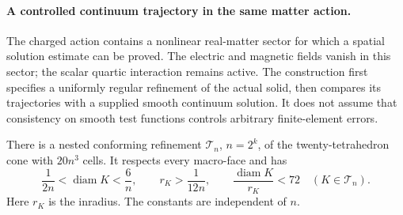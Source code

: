 \paragraph{A controlled continuum trajectory in the same matter action.}
The charged action contains a nonlinear real-matter sector for which a
spatial solution estimate can be proved. The electric and magnetic fields
vanish in this sector; the scalar quartic interaction remains active.
The construction first specifies a uniformly regular refinement of the
actual solid, then compares its trajectories with a supplied smooth
continuum solution. It does not assume that consistency on smooth test
functions controls arbitrary finite-element errors.

\begin{proposition}
\label{prop:whitney-uniform-cone-refinement}
There is a nested conforming refinement \(\mathcal T_n\),
\(n=2^k\), of the twenty-tetrahedron cone with \(20n^3\) cells.
It respects every macro-face and has
\[
 \frac{1}{2n}<\operatorname{diam}K<\frac6n,
 \qquad r_K>\frac{1}{12n},
 \qquad \frac{\operatorname{diam}K}{r_K}<72
 \quad(K\in\mathcal T_n).
\]
Here \(r_K\) is the inradius. The constants are independent of \(n\).
\end{proposition}
